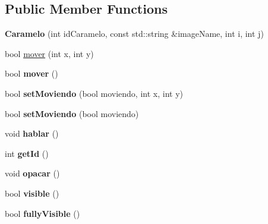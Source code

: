 \subsection*{Public Member Functions}
\begin{DoxyCompactItemize}
\item 
\hypertarget{classCaramelo_ad644d804aa540a9e1c59c7c8f7f914f3}{{\bfseries Caramelo} (int id\-Caramelo, const std\-::string \&image\-Name, int i, int j)}\label{classCaramelo_ad644d804aa540a9e1c59c7c8f7f914f3}

\item 
bool \hyperlink{classCaramelo_a080a820b554dbeac08583e59151760d4}{mover} (int x, int y)
\item 
\hypertarget{classCaramelo_ae5196c6f1bd18fe6fba0aa15fd91df8d}{bool {\bfseries mover} ()}\label{classCaramelo_ae5196c6f1bd18fe6fba0aa15fd91df8d}

\item 
\hypertarget{classCaramelo_abb98e7f3265f171f4d394898b74e154a}{bool {\bfseries set\-Moviendo} (bool moviendo, int x, int y)}\label{classCaramelo_abb98e7f3265f171f4d394898b74e154a}

\item 
\hypertarget{classCaramelo_accd2373bc4d6ce8cd7837e5a2137e8bb}{bool {\bfseries set\-Moviendo} (bool moviendo)}\label{classCaramelo_accd2373bc4d6ce8cd7837e5a2137e8bb}

\item 
\hypertarget{classCaramelo_af8de0bc3a7f309ad710f19d3a75cbe2e}{void {\bfseries hablar} ()}\label{classCaramelo_af8de0bc3a7f309ad710f19d3a75cbe2e}

\item 
\hypertarget{classCaramelo_ab2c31f222a395e70b878bee9b77d3c74}{int {\bfseries get\-Id} ()}\label{classCaramelo_ab2c31f222a395e70b878bee9b77d3c74}

\item 
\hypertarget{classCaramelo_ac89c8be83cdb7c388d3af32aac6f1f75}{void {\bfseries opacar} ()}\label{classCaramelo_ac89c8be83cdb7c388d3af32aac6f1f75}

\item 
\hypertarget{classCaramelo_ad0f46a451e47d6be971cd3e23afb0eb0}{bool {\bfseries visible} ()}\label{classCaramelo_ad0f46a451e47d6be971cd3e23afb0eb0}

\item 
\hypertarget{classCaramelo_aecb211987104ab0ec6eab44abd8e4f3e}{bool {\bfseries fully\-Visible} ()}\label{classCaramelo_aecb211987104ab0ec6eab44abd8e4f3e}


\end{DoxyCompactItemize}
